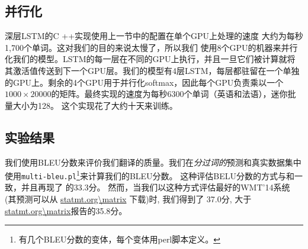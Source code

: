 \subsection{并行化}

深层LSTM的C ++实现使用上一节中的配置在单个GPU上处理的速度
大约为每秒1,700个单词。这对我们的目的来说太慢了，所以我们
使用8个GPU的机器来并行化我们的模型。LSTM的每一层在不同的GPU上执行，并且一旦它们被计算就将其激活值传送到下一个GPU层。我们的模型有4层LSTM，每层都驻留在一个单独的GPU上。剩余的4个GPU用于并行化softmax，因此每个GPU负责乘以一个$1000\times 20000$的矩阵。最终实现的速度为每秒6300个单词（英语和法语），迷你批量大小为128。
这个实现花了大约十天来训练。

\subsection{实验结果}

我们使用BLEU分数\cite{bleu}来评价我们翻译的质量。我们在\emph{分过词的}预测和真实数据集中使用\texttt{multi-bleu.pl}\footnote{有几个BLEU分数的变体，每个变体用perl脚本定义。}来计算我们的BLEU分数。
这种评估BELU分数的方式与\cite{cho14}和\cite{bog14}一致，并且再现了
\cite{wmt14_en_fr}的33.3分。
然而，当我们以这种方式评估最好的WMT'14系统 \cite{durrani-EtAl:2014:W14-33}
(其预测可以从 \url{statmt.org\matrix} 下载)时, 我们得到了   
37.0分, 大于 \url{statmt.org\matrix}报告的35.8分。  





